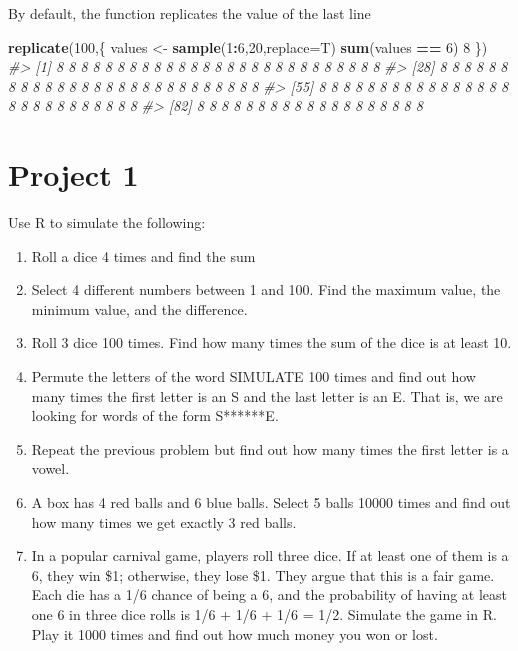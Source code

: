 \documentclass[
]{book}
\newenvironment{Shaded}{\begin{snugshade}}{\end{snugshade}}
\newcommand{\AttributeTok}[1]{\textcolor[rgb]{0.13,0.29,0.53}{#1}}
\newcommand{\CommentTok}[1]{\textcolor[rgb]{0.56,0.35,0.01}{\textit{#1}}}
\newcommand{\DecValTok}[1]{\textcolor[rgb]{0.00,0.00,0.81}{#1}}
\newcommand{\FunctionTok}[1]{\textcolor[rgb]{0.13,0.29,0.53}{\textbf{#1}}}
\newcommand{\NormalTok}[1]{#1}
\newcommand{\OtherTok}[1]{\textcolor[rgb]{0.56,0.35,0.01}{#1}}
\newcommand{\SpecialCharTok}[1]{\textcolor[rgb]{0.81,0.36,0.00}{\textbf{#1}}}
\providecommand{\tightlist}{%
  \setlength{\itemsep}{0pt}\setlength{\parskip}{0pt}}
\theoremstyle{definition}
\theoremstyle{definition}
\theoremstyle{definition}
\theoremstyle{definition}
\theoremstyle{remark}
\begin{document}
By default, the function replicates the value of the last line

\begin{Shaded}
\begin{Highlighting}[]
\FunctionTok{replicate}\NormalTok{(}\DecValTok{100}\NormalTok{,\{}
\NormalTok{  values }\OtherTok{\textless{}{-}} \FunctionTok{sample}\NormalTok{(}\DecValTok{1}\SpecialCharTok{:}\DecValTok{6}\NormalTok{,}\DecValTok{20}\NormalTok{,}\AttributeTok{replace=}\NormalTok{T)}
  \FunctionTok{sum}\NormalTok{(values }\SpecialCharTok{==} \DecValTok{6}\NormalTok{)}
  \DecValTok{8}
\NormalTok{\})}
\CommentTok{\#\textgreater{}   [1] 8 8 8 8 8 8 8 8 8 8 8 8 8 8 8 8 8 8 8 8 8 8 8 8 8 8 8}
\CommentTok{\#\textgreater{}  [28] 8 8 8 8 8 8 8 8 8 8 8 8 8 8 8 8 8 8 8 8 8 8 8 8 8 8 8}
\CommentTok{\#\textgreater{}  [55] 8 8 8 8 8 8 8 8 8 8 8 8 8 8 8 8 8 8 8 8 8 8 8 8 8 8 8}
\CommentTok{\#\textgreater{}  [82] 8 8 8 8 8 8 8 8 8 8 8 8 8 8 8 8 8 8 8}
\end{Highlighting}
\end{Shaded}

\hypertarget{project-1}{%
\chapter{Project 1}\label{project-1}}

Use R to simulate the following:

\begin{enumerate}
\def\labelenumi{\arabic{enumi}.}
\tightlist
\item
  Roll a dice 4 times and find the sum
\item
  Select 4 different numbers between 1 and 100. Find the maximum value, the minimum value, and the difference.
\item
  Roll 3 dice 100 times. Find how many times the sum of the dice is at least 10.
\item
  Permute the letters of the word SIMULATE 100 times and find out how many times the first letter is an S and the last letter is an E. That is, we are looking for words of the form S******E.
\item
  Repeat the previous problem but find out how many times the first letter is a vowel.
\item
  A box has 4 red balls and 6 blue balls. Select 5 balls 10000 times and find out how many times we get exactly 3 red balls.
\item
  In a popular carnival game, players roll three dice. If at least one of them is a 6, they win \$1; otherwise, they lose \$1. They argue that this is a fair game. Each die has a 1/6 chance of being a 6, and the probability of having at least one 6 in three dice rolls is 1/6 + 1/6 + 1/6 = 1/2. Simulate the game in R. Play it 1000 times and find out how much money you won or lost.
\end{enumerate}
\end{document}
